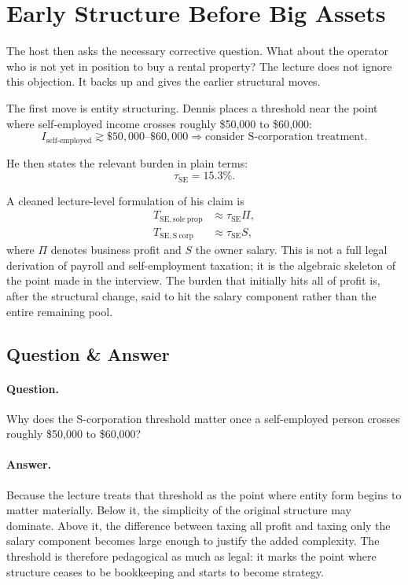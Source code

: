 \section{Early Structure Before Big Assets}

The host then asks the necessary corrective question. What about the operator who is not yet in position to buy a rental property? The lecture does not ignore this objection. It backs up and gives the earlier structural moves.

The first move is entity structuring. Dennis places a threshold near the point where self-employed income crosses roughly \$50{,}000 to \$60{,}000:
\begin{equation}
I_{\text{self-employed}} \gtrsim \$50{,}000\text{--}\$60{,}000
\Rightarrow
\text{consider S-corporation treatment}.
\end{equation}

He then states the relevant burden in plain terms:
\begin{equation}
\tau_{\mathrm{SE}} = 15.3\%.
\end{equation}

A cleaned lecture-level formulation of his claim is
\begin{align}
T_{\mathrm{SE,sole\ prop}} &\approx \tau_{\mathrm{SE}}\Pi, \\
T_{\mathrm{SE,S\ corp}} &\approx \tau_{\mathrm{SE}}S,
\end{align}
where \(\Pi\) denotes business profit and \(S\) the owner salary. This is not a full legal derivation of payroll and self-employment taxation; it is the algebraic skeleton of the point made in the interview. The burden that initially hits all of profit is, after the structural change, said to hit the salary component rather than the entire remaining pool.

\subsection{Question \& Answer}

\paragraph{Question.} Why does the S-corporation threshold matter once a self-employed person crosses roughly \$50{,}000 to \$60{,}000?

\paragraph{Answer.} Because the lecture treats that threshold as the point where entity form begins to matter materially. Below it, the simplicity of the original structure may dominate. Above it, the difference between taxing all profit and taxing only the salary component becomes large enough to justify the added complexity. The threshold is therefore pedagogical as much as legal: it marks the point where structure ceases to be bookkeeping and starts to become strategy.

